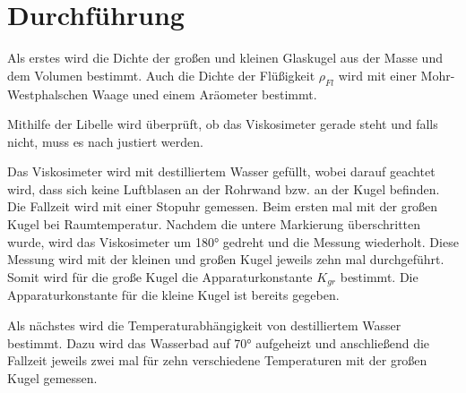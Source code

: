 \section{Durchführung}
\label{sec:Durchführung}

Als erstes wird die Dichte der großen und kleinen Glaskugel aus der Masse und dem Volumen bestimmt. 
Auch die Dichte der Flüßigkeit $\rho_{Fl}$ wird mit einer Mohr-Westphalschen Waage uned einem Aräometer bestimmt. 

Mithilfe der Libelle wird überprüft, ob das Viskosimeter gerade steht und falls nicht, muss es nach justiert werden. 

Das Viskosimeter wird mit destilliertem Wasser gefüllt, wobei darauf geachtet wird, dass sich keine Luftblasen an der Rohrwand bzw. an der Kugel befinden. 
Die Fallzeit wird mit einer Stopuhr gemessen. Beim ersten mal mit der großen Kugel bei Raumtemperatur. Nachdem die untere Markierung überschritten 
wurde, wird das Viskosimeter um 180° gedreht und die Messung wiederholt. Diese Messung wird mit der kleinen und großen Kugel jeweils zehn mal durchgeführt. Somit wird für die große Kugel die Apparaturkonstante $K_{gr}$ bestimmt. Die Apparaturkonstante für die kleine Kugel ist bereits gegeben. 

Als nächstes wird die Temperaturabhängigkeit von destilliertem Wasser bestimmt. Dazu wird das Wasserbad auf 70° aufgeheizt und anschließend die Fallzeit jeweils zwei mal für zehn verschiedene Temperaturen mit der großen Kugel gemessen. 
